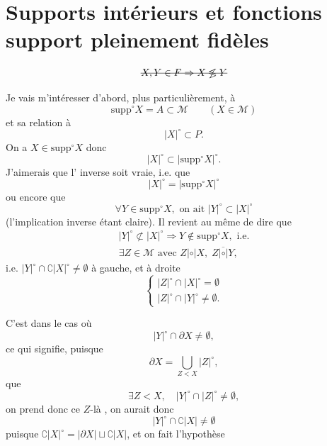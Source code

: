 \documentclass[11pt,a4paper]{article}
\begin{document}
\section{Supports intérieurs et fonctions support pleinement fidèles}



\[
\text{\struck{$X,Y\in F \Rightarrow X \not\lessgtr Y$}}
\]

Je vais m'intéresser d'abord, plus particulièrement, à
\[
\mathrm{supp}^\circ X = A \subset \mathcal{M} \qquad (X\in\mathcal{M})
\]
et sa relation à
\[
|X|^\circ \subset P .
\]
On a $X \in \mathrm{supp}^\circ X$ donc
\[
|X|^\circ \subset |\mathrm{supp}^\circ X|^\circ .
\]
J'aimerais que l' inverse soit vraie, i.e. que
\[
|X|^\circ = |\mathrm{supp}^\circ X|^\circ
\]
ou encore que
\[
\forall Y \in \mathrm{supp}^\circ X, \text{ on ait } |Y|^\circ \subset |X|^\circ
\]
(l'implication inverse étant claire). Il revient au même de dire que 
\[
\begin{gathered}
|Y|^\circ \not\subset |X|^\circ \Longrightarrow Y \notin \mathrm{supp}^\circ X, \text{ i.e.}\\
\exists Z\in\mathcal{M} \text{ avec } Z \mathrel{|{\circ}|} X,\; Z \mathrel{\overline{|\circ|}} Y,
\end{gathered}
\]
i.e. $|Y|^\circ \cap \complement |X|^\circ \neq \emptyset$ à gauche, et à droite
\[
\begin{cases}
|Z|^\circ \cap |X|^\circ = \emptyset\\
|Z|^\circ \cap |Y|^\circ \neq \emptyset .
\end{cases}
\]


C'est  \struck{\ill{}} dans le cas où
\[
|Y|^\circ \cap \partial X \neq \emptyset ,
\]
 ce qui signifie, puisque
\[
\partial X = \bigcup_{Z<X} |Z|^\circ ,
\]
que
\[
\exists Z < X, \quad |Y|^\circ \cap |Z|^\circ \neq \emptyset ,
\]
on prend donc ce $Z$-là , on aurait donc
\[
|Y|^\circ \cap \complement |X| \neq \emptyset
\]
 puisque $\complement |X|^\circ = |\partial X| \sqcup \complement |X|$, et on \ill{} \ill{} fait l'hypothèse \ill{}
\end{document}
